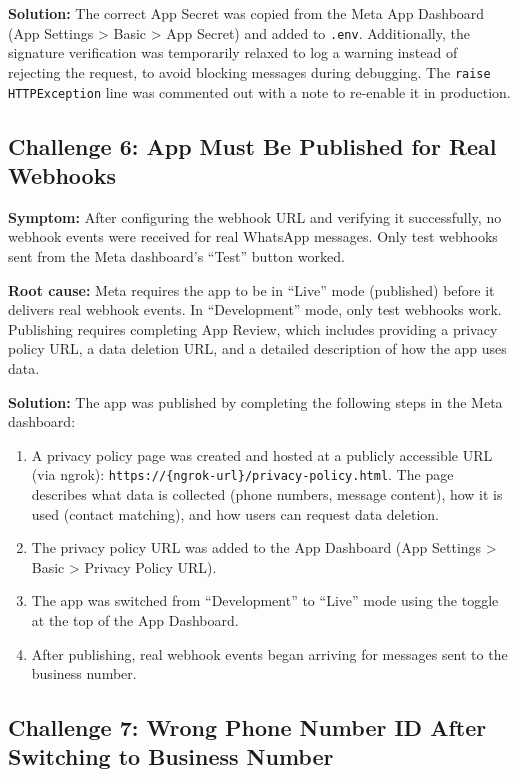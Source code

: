 \documentclass[12pt, a4paper]{report}
\begin{document}
\textbf{Solution:} The correct App Secret was copied from the Meta App Dashboard (App Settings > Basic > App Secret) and added to \texttt{.env}. Additionally, the signature verification was temporarily relaxed to log a warning instead of rejecting the request, to avoid blocking messages during debugging. The \texttt{raise HTTPException} line was commented out with a note to re-enable it in production.

\subsection{Challenge 6: App Must Be Published for Real Webhooks}

\textbf{Symptom:} After configuring the webhook URL and verifying it successfully, no webhook events were received for real WhatsApp messages. Only test webhooks sent from the Meta dashboard's ``Test'' button worked.

\textbf{Root cause:} Meta requires the app to be in ``Live'' mode (published) before it delivers real webhook events. In ``Development'' mode, only test webhooks work. Publishing requires completing App Review, which includes providing a privacy policy URL, a data deletion URL, and a detailed description of how the app uses data.

\textbf{Solution:} The app was published by completing the following steps in the Meta dashboard:

\begin{enumerate}[itemsep=3pt]
    \item A privacy policy page was created and hosted at a publicly accessible URL (via ngrok): \texttt{https://\{ngrok-url\}/privacy-policy.html}. The page describes what data is collected (phone numbers, message content), how it is used (contact matching), and how users can request data deletion.
    \item The privacy policy URL was added to the App Dashboard (App Settings > Basic > Privacy Policy URL).
    \item The app was switched from ``Development'' to ``Live'' mode using the toggle at the top of the App Dashboard.
    \item After publishing, real webhook events began arriving for messages sent to the business number.
\end{enumerate}

\subsection{Challenge 7: Wrong Phone Number ID After Switching to Business Number}
\end{document}
